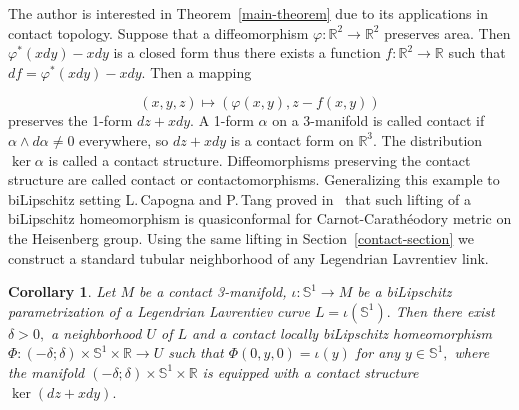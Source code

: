 \documentclass[12pt]{article}
\newtheorem{coro}[prop]{Corollary}
\theoremstyle{definition}
\begin{document}


The author is interested in Theorem~\ref{main-theorem} due to its applications in contact topology. Suppose that a diffeomorphism $\varphi:\mathbb R^2\to\mathbb R^2$ preserves area. Then $\varphi^{*}(xdy) - xdy$ is a closed form thus there exists a function $f:\mathbb R^2\to \mathbb R$ such that $df = \varphi^{*}(xdy) - xdy.$ Then a mapping

$$
(x,y,z) \mapsto (\varphi(x,y), z - f(x,y))
$$
preserves the 1-form $dz + xdy.$ A 1-form $\alpha$ on a 3-manifold is called contact if $\alpha\wedge d\alpha\neq 0$ everywhere, so $dz + xdy$ is a contact form on $\mathbb R^3.$ The distribution $\ker \alpha$ is called a contact structure. Diffeomorphisms preserving the contact structure are called contact or contactomorphisms. Generalizing this example to biLipschitz setting L.\,Capogna and P.\,Tang proved in~\cite[Theorem 5.3]{CapoTang} that such lifting of a biLipschitz homeomorphism is quasiconformal for Carnot-Carath\'eodory metric on the Heisenberg group. Using the same lifting in Section~\ref{contact-section} we construct a standard tubular neighborhood of any Legendrian Lavrentiev link.

\begin{coro}
\label{contact-corollary}
Let $M$ be a contact 3-manifold, $\iota:\mathbb S^1\to M$ be a biLipschitz parametrization of a Legendrian Lavrentiev curve $L = \iota(\mathbb S^1).$ Then there exist $\delta>0,$ a neighborhood $U$ of $L$ and a contact locally biLipschitz homeomorphism $\Phi:(-\delta;\delta)\times\mathbb S^1\times\mathbb R\to U$ such that $\Phi(0,y,0) = \iota(y)$ for any $y\in\mathbb S^1,$ where the manifold $(-\delta;\delta)\times\mathbb S^1\times\mathbb R$ is equipped with a contact structure $\ker(dz + xdy).$
\end{coro}
\end{document}
